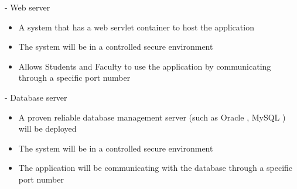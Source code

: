 - Web server 	
  \begin{itemize}
      \item A system that has a web servlet container to host the application
      \item The system will be in a controlled secure environment 
      \item Allows Students and Faculty to use the application by communicating through a specific port number
  \end{itemize}    
- Database server 
  \begin{itemize}
      \item A proven reliable database management server (such as Oracle , MySQL ) will be deployed 
      \item The system will be in a controlled secure environment 
      \item The application will be communicating with the database through a specific port number
  \end{itemize}
